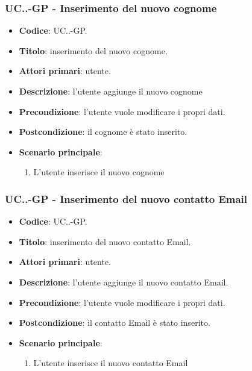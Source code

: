 			\subsubsection{UC\theuccount.\thesubuccount.\thesubsubuccount-GP - Inserimento del nuovo cognome}

				\begin{itemize}
					\item \textbf{Codice}: UC\theuccount.\thesubuccount.\thesubsubuccount-GP.
					\item \textbf{Titolo}: inserimento del nuovo cognome.
					\item \textbf{Attori primari}: utente.
					\item \textbf{Descrizione}: l'utente aggiunge il nuovo cognome
					\item \textbf{Precondizione}: l'utente vuole modificare i propri dati.
					\item \textbf{Postcondizione}: il cognome è stato inserito.
					\item \textbf{Scenario principale}:
					\begin{enumerate}
						\item L'utente inserisce il nuovo cognome
					\end{enumerate}
				\end{itemize}

			\subsubsection{UC\theuccount.\thesubuccount.\thesubsubuccount-GP - Inserimento del nuovo contatto Email}

				\begin{itemize}
					\item \textbf{Codice}: UC\theuccount.\thesubuccount.\thesubsubuccount-GP.
					\item \textbf{Titolo}: inserimento del nuovo contatto Email.
					\item \textbf{Attori primari}: utente.
					\item \textbf{Descrizione}: l'utente aggiunge il nuovo contatto Email.
					\item \textbf{Precondizione}: l'utente vuole modificare i propri dati.
					\item \textbf{Postcondizione}: il contatto Email è stato inserito.
					\item \textbf{Scenario principale}:
					\begin{enumerate}
						\item L'utente inserisce il nuovo contatto Email
					\end{enumerate}
				\end{itemize}

